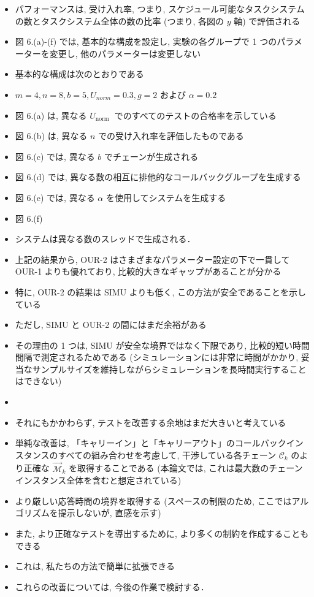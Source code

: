 \begin{frame}{}
    \begin{itemize}
        \item パフォーマンスは, 受け入れ率, つまり, スケジュール可能なタスクシステムの数とタスクシステム全体の数の比率 (つまり, 各図の $y$ 軸) で評価される
\item 図 6.(a)-(f) では, 基本的な構成を設定し, 実験の各グループで 1 つのパラメーターを変更し, 他のパラメーターは変更しない
\item 基本的な構成は次のとおりである
\item $m=4, n=8, b=5, U_{n o r m}=0.3, g=2$ および $\alpha=0.2$ 
\item 図 6.(a) は, 異なる $U_{\text {norm }}$ でのすべてのテストの合格率を示している
\item 図 6.(b) は, 異なる $n$ での受け入れ率を評価したものである
\item 図 6.(c) では, 異なる $b$ でチェーンが生成される
\item 図 6.(d) では, 異なる数の相互に排他的なコールバックグループを生成する
\item 図 6.(e) では, 異なる $\alpha$ を使用してシステムを生成する
\item 図 6.(f)
\item システムは異なる数のスレッドで生成される．
    \end{itemize}
\end{frame}


\begin{frame}{}
    \begin{itemize}
        \item 上記の結果から, OUR-2 はさまざまなパラメーター設定の下で一貫して OUR-1 よりも優れており, 比較的大きなギャップがあることが分かる
\item 特に, OUR-2 の結果は SIMU よりも低く, この方法が安全であることを示している
\item ただし, SIMU と OUR-2 の間にはまだ余裕がある
\item その理由の 1 つは, SIMU が安全な境界ではなく下限であり, 比較的短い時間間隔で測定されるためである (シミュレーションには非常に時間がかかり, 妥当なサンプルサイズを維持しながらシミュレーションを長時間実行することはできない)
\item
\item それにもかかわらず, テストを改善する余地はまだ大きいと考えている
\item 単純な改善は, 「キャリーイン」と「キャリーアウト」のコールバックインスタンスのすべての組み合わせを考慮して, 干渉している各チェーン $\mathcal{C}_{k}$ のより正確な $\overrightarrow{\mathcal{M}}_{k}$ を取得することである (本論文では, これは最大数のチェーンインスタンス全体を含むと想定されている)
\item より厳しい応答時間の境界を取得する (スペースの制限のため, ここではアルゴリズムを提示しないが, 直感を示す)
\item また, より正確なテストを導出するために, より多くの制約を作成することもできる
\item これは, 私たちの方法で簡単に拡張できる
\item これらの改善については, 今後の作業で検討する．
    \end{itemize}
\end{frame}


